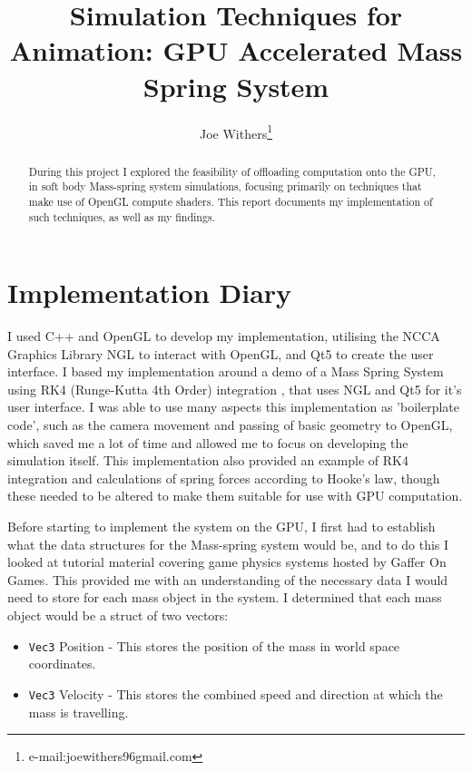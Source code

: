 \documentclass[]{acmsiggraph}
\title{Simulation Techniques for Animation: GPU Accelerated Mass Spring System}
\author{Joe Withers\thanks{e-mail:joewithers96gmail.com}}
\begin{document}

\maketitle

\begin{abstract}
During this project I explored the feasibility of offloading computation onto the GPU, in soft body Mass-spring system simulations, focusing primarily on techniques that make use of OpenGL compute shaders. This report documents my implementation of such techniques, as well as my findings.
\end{abstract}

\section{Implementation Diary} \label{sec:implementation}

I used C++ and OpenGL to develop my implementation, utilising the NCCA Graphics Library NGL \cite{ngl} to interact with OpenGL, and Qt5 to create the user interface. I based my implementation around a demo of a Mass Spring System using RK4 (Runge-Kutta 4th Order) integration \cite{nglMassSpring}, that uses NGL and Qt5 for it's user interface. I was able to use many aspects this implementation as 'boilerplate code', such as the camera movement and passing of basic geometry to OpenGL, which saved me a lot of time and allowed me to focus on developing the simulation itself. This implementation also provided an example of RK4 integration and calculations of spring forces according to Hooke's law, though these needed to be altered to make them suitable for use with GPU computation.

Before starting to implement the system on the GPU, I first had to establish what the data structures for the Mass-spring system would be, and to do this I looked at tutorial material covering game physics systems \cite{gafferPhys} hosted by Gaffer On Games. This provided me with an understanding of the necessary data I would need to store for each mass object in the system. I determined that each mass object would be a struct of two vectors:

\begin{itemize}
	\item \lstinline{Vec3} Position - This stores the position of the mass in world space coordinates.
	\item \lstinline{Vec3} Velocity - This stores the combined speed and direction at which the mass is travelling.
\end{itemize}
\end{document}
